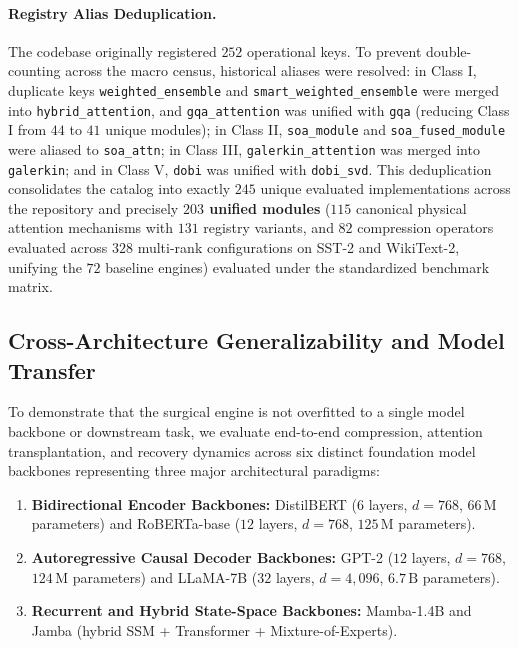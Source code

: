 \paragraph{Registry Alias Deduplication.}
The codebase originally registered $252$ operational keys. To prevent double-counting across the macro census, historical aliases were resolved: in Class I, duplicate keys \texttt{weighted\_ensemble} and \texttt{smart\_weighted\_ensemble} were merged into \texttt{hybrid\_attention}, and \texttt{gqa\_attention} was unified with \texttt{gqa} (reducing Class I from $44$ to $41$ unique modules); in Class II, \texttt{soa\_module} and \texttt{soa\_fused\_module} were aliased to \texttt{soa\_attn}; in Class III, \texttt{galerkin\_attention} was merged into \texttt{galerkin}; and in Class V, \texttt{dobi} was unified with \texttt{dobi\_svd}. This deduplication consolidates the catalog into exactly $245$ unique evaluated implementations across the repository and precisely \textbf{$203$ unified modules} ($115$ canonical physical attention mechanisms with $131$ registry variants, and $82$ compression operators evaluated across $328$ multi-rank configurations on SST-2 and WikiText-2, unifying the $72$ baseline engines) evaluated under the standardized benchmark matrix.

\subsection{Cross-Architecture Generalizability and Model Transfer}
\label{sec:results_cross_model}

To demonstrate that the \neuralops{} surgical engine is not overfitted to a single model backbone or downstream task, we evaluate end-to-end compression, attention transplantation, and recovery dynamics across six distinct foundation model backbones representing three major architectural paradigms:
\begin{enumerate}
    \item \textbf{Bidirectional Encoder Backbones:} DistilBERT ($6$ layers, $d=768$, $66\,\text{M}$ parameters) and RoBERTa-base ($12$ layers, $d=768$, $125\,\text{M}$ parameters).
    \item \textbf{Autoregressive Causal Decoder Backbones:} GPT-2 ($12$ layers, $d=768$, $124\,\text{M}$ parameters) and LLaMA-7B ($32$ layers, $d=4{,}096$, $6.7\,\text{B}$ parameters).
    \item \textbf{Recurrent and Hybrid State-Space Backbones:} Mamba-1.4B and Jamba (hybrid SSM + Transformer + Mixture-of-Experts).
\end{enumerate}

